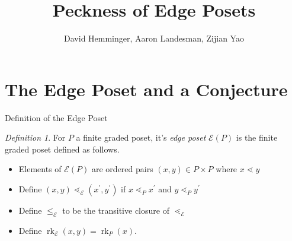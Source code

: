 \documentclass[pdf]{beamer}
\title{Peckness of Edge Posets}
\author{David Hemminger, Aaron Landesman, Zijian Yao}
\theoremstyle{remark}
\newtheorem{defn}[thm]{Definition}
\newcommand\rk{\operatorname{rk}}
\begin{document}
\begin{frame}
	\titlepage
\end{frame}


\section{The Edge Poset and a Conjecture}

\begin{frame}{Definition of the Edge Poset}
\begin{defn}
\label{defn:functor_of_edges}
For $P$ a finite graded poset, it's \textit{edge poset} $\mathcal{E}(P)$ is the finite graded poset defined as follows. 
\begin{itemize}

\item Elements of $\mathcal{E}(P)$ are ordered pairs $(x,y)\in P\times P$ where $x\lessdot y$

\item Define $(x,y) \lessdot_{\mathcal{E}} (x^\prime,y^\prime)$ if $x\lessdot_P x^\prime$ and $y\lessdot_P y^\prime$

\item Define $\le_{\mathcal{E}}$ to be the transitive closure of $\lessdot_{\mathcal{E}}$

\item Define $\rk_{\mathcal{E}}(x,y) = \rk_P(x)$.
\end{itemize}
\end{defn}
\end{frame}
\end{document}
